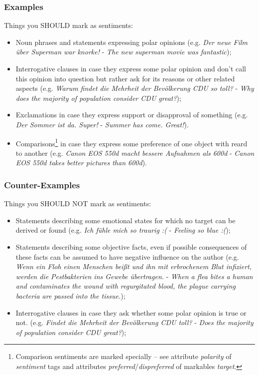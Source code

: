 \documentclass[11pt,a4paper]{article}
\begin{document}
\subsubsection{Examples}
Things you SHOULD mark as sentiments:
\begin{itemize}
  \item Noun phrases and statements expressing polar opinions
    (e.g. \textit{Der neue Film \"uber Superman war knorke!} -
    \textit{The new superman movie was fantastic});
  \item Interrogative clauses in case they express some polar opinion
    and don't call this opinion into question but rather ask for its
    reasons or other related aspects (e.g. \textit{Warum findet die
      Mehrheit der Bev\"olkerung CDU so toll?} - \textit{Why does the
      majority of population consider CDU great?});
  \item Exclamations in case they express support or disapproval of
    something (e.g. \textit{Der Sommer ist da. Super!} -
    \textit{Summer has come. Great!}).
  \item Comparisons\footnote{Comparison sentiments are marked
    specially -- see attribute \textit{polarity} of \textit{sentiment}
    tags and attributes \textit{preferred}/\textit{dispreferred} of
    markables \textit{target}.} in case they express some preference
    of one object with reard to another (e.g. \textit{Canon EOS 550d
      macht bessere Aufnahmen als 600d} - \textit{Canon EOS 550d takes
      better pictures than 600d}).

\end{itemize}

\subsubsection{Counter-Examples}
Things you SHOULD NOT mark as sentiments:
\begin{itemize}
  \item Statements describing some emotional states for which no
    target can be derived or found (e.g. \textit{Ich f\"uhle mich so
      traurig :(} - \textit{Feeling so blue :(});
  \item Statements describing some objective facts, even if possible
    consequences of these facts can be assumed to have negative
    influence on the author (e.g. \textit{Wenn ein Floh einen Menschen
      bei\ss{}t und ihn mit erbrochenem Blut infiziert, werden die
      Pestbakterien ins Gewebe \"ubertragen.} - \textit{When a flea
      bites a human and contaminates the wound with regurgitated
      blood, the plague carrying bacteria are passed into the
      tissue.});
  \item Interrogative clauses in case they ask whether some polar
    opinion is true or not. (e.g. \textit{Findet die Mehrheit
      der Bev\"olkerung CDU toll?} - \textit{Does the majority
      of population consider CDU great?});
\end{itemize}
\end{document}
